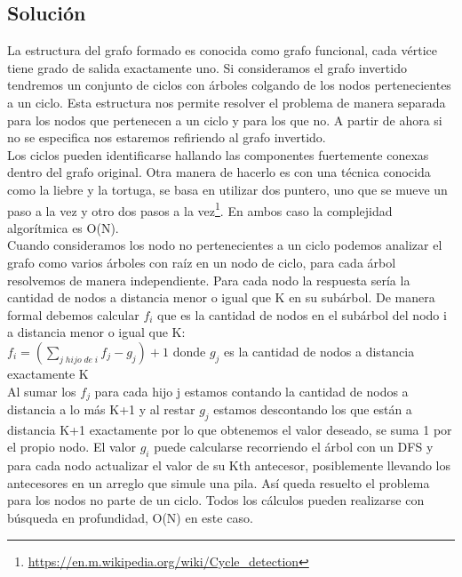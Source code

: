 \documentclass{report}
\begin{document}
\subsection{Soluci\'on}
La estructura del grafo formado es conocida como grafo funcional, cada v\'ertice tiene grado de salida exactamente uno\cite{Skiena}. Si consideramos el grafo invertido tendremos un conjunto de ciclos con \'arboles colgando de los nodos pertenecientes a un ciclo. Esta estructura nos permite resolver el problema de manera separada para los nodos que pertenecen a un ciclo y para los que no. A partir de ahora si no se especifica nos estaremos refiriendo al grafo invertido.\\
Los ciclos pueden identificarse hallando las componentes fuertemente conexas dentro del grafo original. Otra manera de hacerlo es con una t\'ecnica conocida como la liebre y la tortuga, se basa en utilizar dos puntero, uno que se mueve un paso a la vez y otro dos pasos a la vez\footnote{\hyperlink{FloydAlgorithm}{https://en.m.wikipedia.org/wiki/Cycle\_detection}}. En ambos caso la complejidad algor\'itmica es O(N).\\
Cuando consideramos los nodo no pertenecientes a un ciclo podemos analizar el grafo como varios \'arboles con ra\'iz en un nodo de ciclo, para cada \'arbol resolvemos de manera independiente. Para cada nodo la respuesta ser\'ia la cantidad de nodos a distancia menor o igual que K en su sub\'arbol. De manera formal debemos calcular $f_i$ que es la cantidad de nodos en el sub\'arbol del nodo i a distancia menor o igual que K:\\
$\displaystyle f_i = (\sum_{j \;hijo \;de\; i}f_j - g_j ) + 1$ donde $g_j$ es la cantidad de nodos a distancia exactamente K\\
  Al sumar los $f_j$ para cada hijo j estamos contando la cantidad de nodos a distancia a lo m\'as K+1 y al restar $g_j$ estamos descontando los que est\'an a distancia K+1 exactamente por lo que obtenemos el valor deseado, se suma 1 por el propio nodo. El valor $g_i$ puede calcularse recorriendo el \'arbol con un DFS y para cada nodo actualizar el valor de su Kth antecesor, posiblemente llevando los antecesores en un arreglo que simule una pila. As\'i queda resuelto el problema para los nodos no parte de un ciclo. Todos los c\'alculos pueden realizarse con b\'usqueda en profundidad, O(N) en este caso.\\
\end{document}
